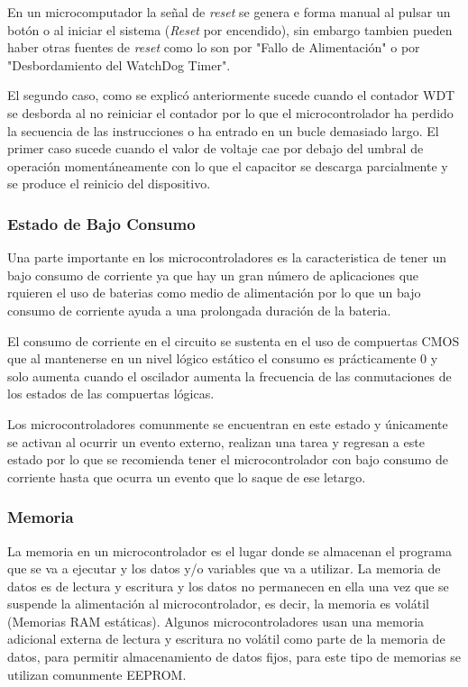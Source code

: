 \documentclass[letterpaper,12pt,oneside]{book}
\begin{document}
				En un microcomputador la señal de \textit{reset} se genera e forma manual al pulsar un botón o al iniciar el sistema (\textit{Reset} por encendido), sin embargo tambien pueden haber otras fuentes de \textit{reset} como lo son por "Fallo de Alimentación" o por "Desbordamiento del WatchDog Timer".

				El segundo caso, como se explicó anteriormente sucede cuando el contador WDT se desborda al no reiniciar el contador por lo que el microcontrolador ha perdido la secuencia de las instrucciones o ha entrado en un bucle demasiado largo. El primer caso sucede cuando el valor de voltaje cae por debajo del umbral de operación momentáneamente con lo que el capacitor se descarga parcialmente y se produce el reinicio del dispositivo.

				\subsubsection{Estado de Bajo Consumo}
				Una parte importante en los microcontroladores es la caracteristica de tener un bajo consumo de corriente ya que hay un gran número de aplicaciones que rquieren el uso de baterias como medio de alimentación por lo que un bajo consumo de corriente ayuda a una prolongada duración de la bateria.

				El consumo de corriente en el circuito se sustenta en el uso de compuertas CMOS que al mantenerse en un nivel lógico estático el consumo es prácticamente 0 y solo aumenta cuando el oscilador aumenta la frecuencia de las conmutaciones de los estados de las compuertas lógicas.

				Los microcontroladores comunmente se encuentran en este estado y únicamente se activan al ocurrir un evento externo, realizan una tarea y regresan a este estado por lo que se recomienda tener el microcontrolador con bajo consumo de corriente hasta que ocurra un evento que lo saque de ese letargo.

				\subsubsection{Memoria}
				La memoria en un microcontrolador es el lugar donde se almacenan el programa que se va a ejecutar y los datos y/o variables que va a utilizar. La memoria de datos es de lectura y escritura y los datos no permanecen en ella una vez que se suspende la alimentación al microcontrolador, es decir, la memoria es volátil (Memorias RAM estáticas). Algunos microcontroladores usan una memoria adicional externa de lectura y escritura no volátil como parte de la memoria de datos, para permitir almacenamiento de datos fijos, para este tipo de memorias se utilizan comunmente EEPROM.
\end{document}
